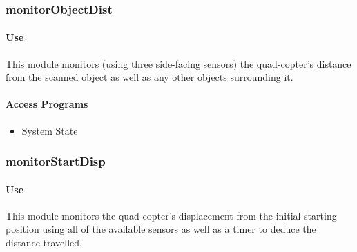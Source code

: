 \documentclass[10pt,letterpaper]{article}
\begin{document}
\subsubsection{monitorObjectDist}
\paragraph{Use}
This module monitors (using three side-facing sensors) the quad-copter's distance from the scanned object as well as any other objects surrounding it.
\paragraph{Access Programs}
\begin{itemize}
	\item System State 
\end{itemize}
\begin{table}[H]
  \caption{monitorObjectDist}
\end{table}

\subsubsection{monitorStartDisp}
\paragraph{Use}
This module monitors the quad-copter's displacement from the initial starting position using all of the available sensors as well as a timer to deduce the distance travelled.
\end{document}
